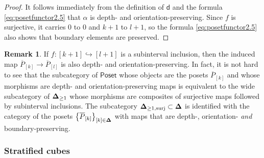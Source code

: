 \documentclass[10pt, reqno, twoside
, final
]{amsart}
\numberwithin{equation}{subsection}%
\theoremstyle{definition}
\theoremstyle{definition}
\theoremstyle{definition}
\theoremstyle{definition}
\theoremstyle{definition}
\theoremstyle{definition}
\theoremstyle{definition}
\theoremstyle{definition}
\theoremstyle{definition}
\theoremstyle{plain}
\theoremstyle{definition}
\theoremstyle{plain}
\theoremstyle{definition}
\theoremstyle{plain}
\theoremstyle{definition}
\newtheorem{rmk}[defn]{Remark}
\theoremstyle{definition}
\theoremstyle{plain}
\theoremstyle{plain}
\theoremstyle{definition}
\theoremstyle{plain}
\theoremstyle{plain}
\theoremstyle{plain}
\begin{document}
\begin{proof}
It follows immediately from the definition of $\mathsf{d}$ and the formula \eqref{eq:posetfunctor2.5} that $\alpha$ is depth- and orientation-preserving. Since $f$ is surjective, it carries $0$ to $0$ and $k+1$ to $l+1$, so the formula \eqref{eq:posetfunctor2.5} also shows that boundary elements are preserved.
\end{proof}
\begin{rmk}
If $f:[k+1]\hookrightarrow  [l+1]$ is a subinterval inclusion, then the induced map $\overline{P}_{[k]}\rightarrow \overline{P}_{[l]}$ is also depth- and orientation-preserving. In fact, it is not hard to see that the subcategory of $\mathsf{Poset}$ whose objects are the posets $\overline{P}_{[k]}$ and whose morphisms are depth- and orientation-preserving maps is equivalent to the wide subcategory of $\boldsymbol{\Delta}_{\geq 1}$ whose morphisms are composites of surjective maps followed by subinterval inclusions.  The subcategory $\boldsymbol{\Delta}_{\geq 1,\mathrm{surj}}\subset \boldsymbol{\Delta}$ is identified with the category of the posets $\left\{\overline{P}_{[k]}\right\}_{[k]\in\boldsymbol{\Delta}}$ with maps that are depth-, orientation- \emph{and} boundary-preserving.
\end{rmk}

\subsubsection{Stratified cubes}
\end{document}
